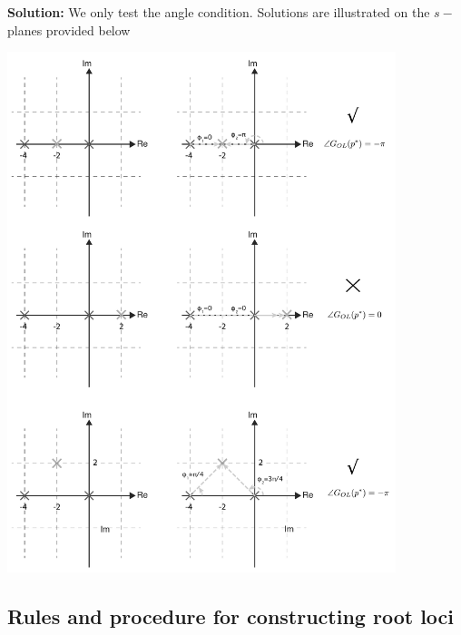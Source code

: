 \documentclass[twoside]{article}
\begin{document}
 \textbf{Solution:}  We only test the angle
 condition. Solutions are illustrated on the $s-$planes
provided below

 \begin{center}
\begin{minipage}[h]{\linewidth}
    \begin{center}
      \includegraphics[width=0.85\textwidth]{exangle}
    \end{center}
\end{minipage}
\end{center}

\subsection{Rules and procedure for constructing root loci}
\end{document}
